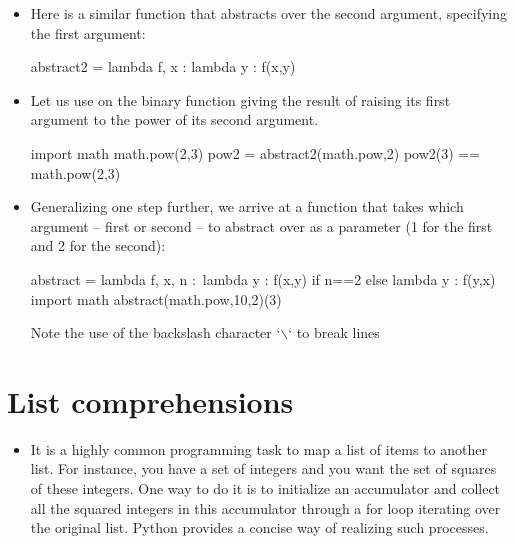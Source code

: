 \documentclass[a4paper]{article}
\begin{document}
{\begin{itemize}
\begin{ucodeframe}
\begin{pyconsole}
import math
log2 = abstract1(math.log,2)
log2(16)
\end{pyconsole}
\end{ucodeframe}

\item Here is a similar function that abstracts over the second argument,
specifying the first argument:

\begin{ucodeframe}
\begin{pyconsole}
abstract2 = lambda f, x : lambda y : f(x,y)
\end{pyconsole}
\end{ucodeframe}

\item Let us use  on the binary function  giving the
result of raising its first argument to the power of its second argument.  

\begin{ucodeframe}
\begin{pyconsole}
import math
math.pow(2,3)
pow2 = abstract2(math.pow,2)
pow2(3) == math.pow(2,3)
\end{pyconsole}
\end{ucodeframe}

\item Generalizing one step further, we arrive at a function  that
takes which argument -- first or second -- to abstract over as a parameter (1
for the first and 2 for the second):

\begin{ucodeframe}
\begin{pyconsole}
abstract = lambda f, x, n :\
lambda y : f(x,y) if n==2 else lambda y : f(y,x)
import math
abstract(math.pow,10,2)(3)
\end{pyconsole}
\end{ucodeframe}
Note the use of the backslash  character `$\backslash$` to break lines

\end{itemize}

\section{List comprehensions}

\begin{itemize}
\item It is a highly common programming task to map a list of items to another
list. For instance, you have a set of integers and you want the set of squares
of these integers. One way to do it is to initialize an accumulator and
collect all the squared integers in this accumulator through a for loop
iterating over the original list. Python provides a concise way of realizing
such processes.


\end{itemize}}
\end{document}
